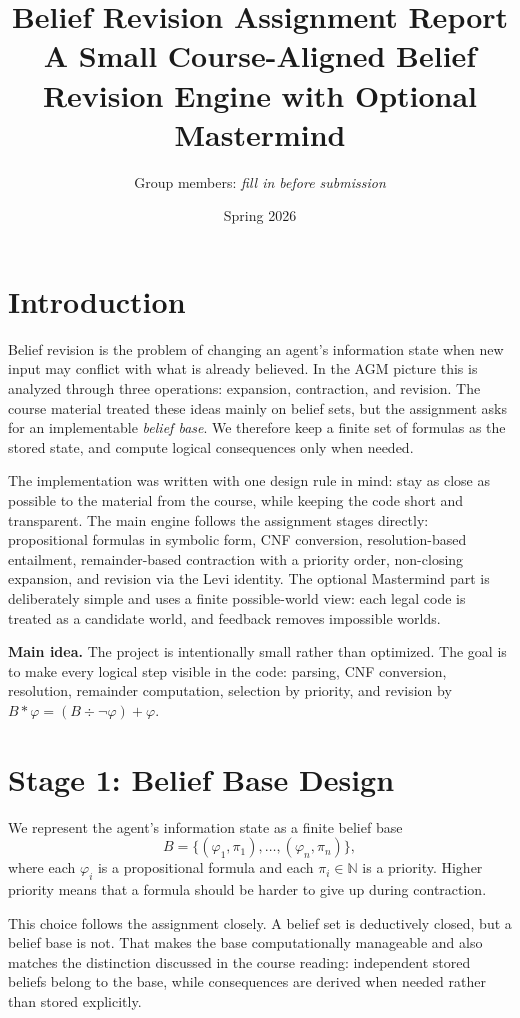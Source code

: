 \documentclass[11pt,a4paper]{article}
\title{\vspace{-1.2em}\textbf{Belief Revision Assignment Report}\\
\large A Small Course-Aligned Belief Revision Engine with Optional Mastermind}
\author{Group members: \textit{fill in before submission}}
\date{Spring 2026}
\begin{document}
\maketitle
\thispagestyle{fancy}

\section{Introduction}
Belief revision is the problem of changing an agent's information state when new input may conflict with what is already believed. In the AGM picture this is analyzed through three operations: expansion, contraction, and revision. The course material treated these ideas mainly on belief sets, but the assignment asks for an implementable \emph{belief base}. We therefore keep a finite set of formulas as the stored state, and compute logical consequences only when needed.

The implementation was written with one design rule in mind: stay as close as possible to the material from the course, while keeping the code short and transparent. The main engine follows the assignment stages directly: propositional formulas in symbolic form, CNF conversion, resolution-based entailment, remainder-based contraction with a priority order, non-closing expansion, and revision via the Levi identity. The optional Mastermind part is deliberately simple and uses a finite possible-world view: each legal code is treated as a candidate world, and feedback removes impossible worlds.

\begin{keybox}
\textbf{Main idea.} The project is intentionally small rather than optimized. The goal is to make every logical step visible in the code: parsing, CNF conversion, resolution, remainder computation, selection by priority, and revision by \(B * \varphi = (B \div \neg \varphi) + \varphi\).
\end{keybox}

\section{Stage 1: Belief Base Design}
We represent the agent's information state as a finite belief base
\[
B = \{(\varphi_1, \pi_1), \ldots, (\varphi_n, \pi_n)\},
\]
where each \(\varphi_i\) is a propositional formula and each \(\pi_i \in \mathbb{N}\) is a priority. Higher priority means that a formula should be harder to give up during contraction.

This choice follows the assignment closely. A belief set is deductively closed, but a belief base is not. That makes the base computationally manageable and also matches the distinction discussed in the course reading: independent stored beliefs belong to the base, while consequences are derived when needed rather than stored explicitly.
\end{document}
